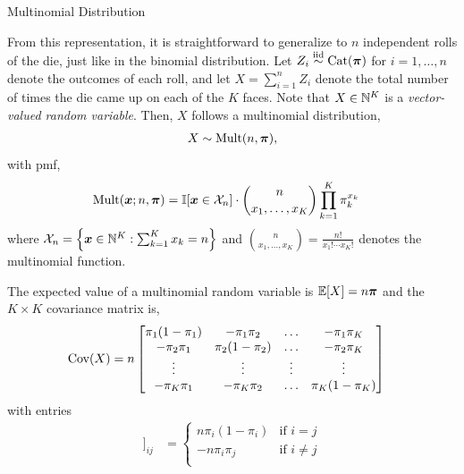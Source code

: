 \documentclass[aspectratio=169]{beamer}
\begin{document}
\begin{frame}[t,allowframebreaks]{Multinomial Distribution}
  \label{multinomial-distribution}

From this representation, it is straightforward to generalize to \(n\)
independent rolls of the die, just like in the binomial distribution.
Let \(Z_i \stackrel{\text{iid}}{\sim} \mathrm{Cat}(\boldsymbol{\pi})\) for \(i=1,\ldots,n\) denote the
outcomes of each roll, and let \(X = \sum_{i=1}^n Z_i\) denote the total
number of times the die came up on each of the \(K\) faces. Note that
\(X \in \mathbb{N}^K\) is a \emph{vector-valued random variable}. Then,
\(X\) follows a multinomial distribution, \begin{align*}
X \sim \mathrm{Mult}(n, \boldsymbol{\pi}),
\end{align*} with pmf, \begin{align*}
\mathrm{Mult}(\boldsymbol{x}; n, \boldsymbol{\pi}) &= \mathbb{I}[\boldsymbol{x} \in \mathcal{X}_n] \cdot {n \choose x_1, \ldots
, x_K} \prod_{k=1}^K \pi_k^{x_k} 
\end{align*} where
\(\mathcal{X}_n = \left\{\boldsymbol{x} \in \mathbb{N}^K : \sum_{k=1}^K x_k = n \right\}\)
and ${n \choose x_1, \ldots, x_K} = \frac{n!}{x_1! \cdots x_K!}$ denotes the multinomial function.

The expected value of a multinomial random variable is
\(\mathbb{E}[X] = n \boldsymbol{\pi}\) and the \(K \times K\) covariance matrix is,
\begin{align*}
\textrm{Cov}(X) &= n 
\begin{bmatrix}
\pi_1(1-\pi_1) & -\pi_1 \pi_2 & \ldots & -\pi_1 \pi_K \\
-\pi_2 \pi_1 & \pi_2 (1-\pi_2) & \ldots & -\pi_2 \pi_K \\
\vdots & \vdots & \vdots & \vdots \\
-\pi_K \pi_1 & -\pi_K \pi_2 & \ldots & \pi_K (1- \pi_K)
\end{bmatrix}
\end{align*} with entries \begin{align*}
[\Cov[X]]_{ij} &= 
\begin{cases}
n \pi_i (1-\pi_i) & \text{if } i = j \\
-n \pi_i \pi_j & \text{if } i \neq j \\
\end{cases}
\end{align*}

\end{frame}
\end{document}
